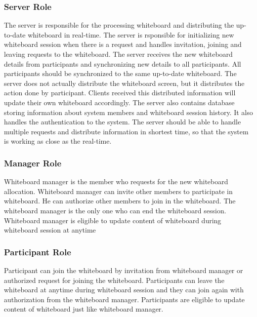 \documentclass[conference]{IEEEtran}
\begin{document}
\subsubsection{Server Role}
The server is responsible for the processing whiteboard and distributing the up-to-date whiteboard in real-time. The server is rsponsible for initializing new whiteboard session when there is a request and handles invitation, joining and leaving requests to the whiteboard. The server receives the new whiteboard details from participants and synchronizing new details to all participants. All participants should be synchronized to the same up-to-date whiteboard. The server does not actually distribute the whiteboard screen, but it distributes the action done by participant. Clients received this distributed information will update their own whiteboard accordingly. The server also contains database storing information about system members and whiteboard session history. It also handles the authentication to the system. The server should be able to handle multiple requests and distribute information in shortest time, so that the system is working as close as the real-time.
\subsubsection{Manager Role}
Whiteboard manager is the member who requests for the new whiteboard allocation. Whiteboard manager can invite other members to participate in whiteboard. He can authorize other members to join in the whiteboard. The whiteboard manager is the only one who can end the whiteboard session. Whiteboard manager is eligible to update content of whiteboard during whiteboard session at anytime
\subsubsection{Participant Role}
Participant can join the whiteboard by invitation from whiteboard manager or authorized request for joining the whiteboard. Participants can leave the whiteboard at anytime during whiteboard session and they can join again with authorization from the whiteboard manager. Participants are eligible to update content of whiteboard just like whiteboard manager.
\end{document}
